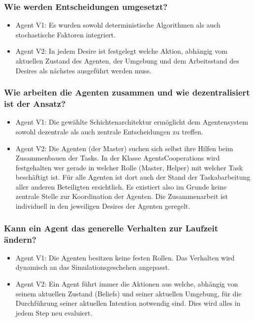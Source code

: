 \documentclass[runningheads]{llncs}
\begin{document}
	\subsubsection{Wie werden Entscheidungen umgesetzt?}
	\begin{itemize}
		\item Agent V1: Es wurden sowohl deterministische Algorithmen als auch stochastische Faktoren integriert.
		\item Agent V2: In jedem Desire ist festgelegt welche Aktion, abhängig vom aktuellen Zustand des Agenten, der Umgebung und dem Arbeitsstand des Desires als nächstes ausgeführt werden muss.
	\end{itemize}
	
	\subsubsection{Wie arbeiten die Agenten zusammen und wie dezentralisiert ist der Ansatz?}
	\begin{itemize}
		\item Agent V1: Die gewählte Schichtenarchitektur ermöglicht dem Agentensystem sowohl dezentrale als auch zentrale Entscheidungen zu treffen.
		\item Agent V2: Die Agenten (der Master) suchen sich selbst ihre Hilfen beim Zusammenbauen der Tasks. In der Klasse AgentsCooperations wird festgehalten wer gerade in welcher Rolle (Master, Helper) mit welcher Task beschäftigt ist. Für alle Agenten ist dort auch der Stand der Taskabarbeitung aller anderen Beteiligten ersichtlich. Es existiert also im Grunde keine zentrale Stelle zur Koordination der Agenten. Die Zusammenarbeit ist individuell in den jeweiligen Desires der Agenten geregelt.
	\end{itemize}
	
	\subsubsection{Kann ein Agent das generelle Verhalten zur Laufzeit ändern?}
	\begin{itemize}
		\item Agent V1: Die Agenten besitzen keine festen Rollen. Das Verhalten wird dynamisch an das Simulationsgeschehen angepasst.
		\item Agent V2: Ein Agent führt immer die Aktionen aus welche, abhängig von seinem aktuellen Zustand (Beliefs) und seiner aktuellen Umgebung, für die Durchführung seiner aktuellen Intention notwendig sind. Dies wird alles in jedem Step neu evaluiert.
	\end{itemize}
	
\end{document}
